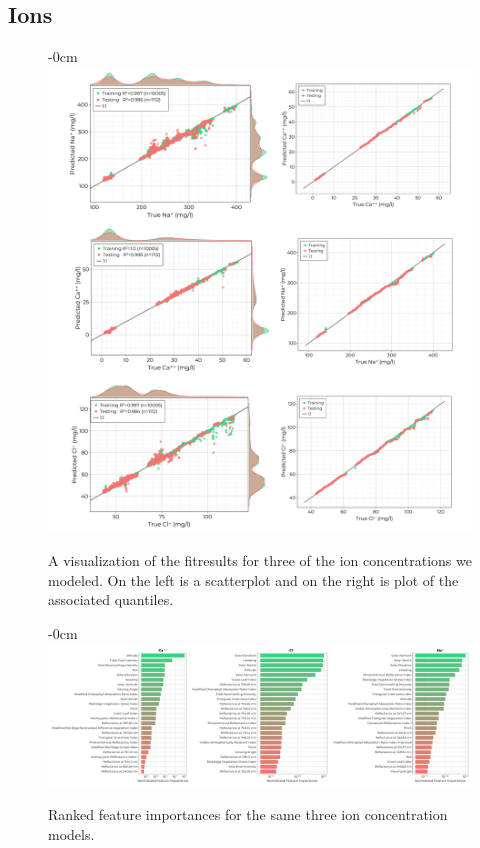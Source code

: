 \documentclass[journal,article,submit,pdftex,moreauthors]{Definitions/mdpi}
\begin{document}
\subsection{Ions}

\begin{figure}[H]
\begin{adjustwidth}{-\extralength}{0cm}
\centering
\includegraphics[width=16.0cm]{paper/figures/results/fits/ions-fitres.pdf}
\end{adjustwidth}
\caption{A visualization of the fitresults for three of the ion concentrations we modeled. On the left is a scatterplot and on the right is plot of the associated quantiles.\label{fig:ions-fit}}
\end{figure}  

\begin{figure}[H]
\begin{adjustwidth}{-\extralength}{0cm}
\centering
\includegraphics[width=18.0cm]{paper/figures/results/fits/ions-ranking.pdf}
\end{adjustwidth}
\caption{Ranked feature importances for the same three ion concentration models.\label{fig:ions-fit}}
\end{figure}  
\end{document}
